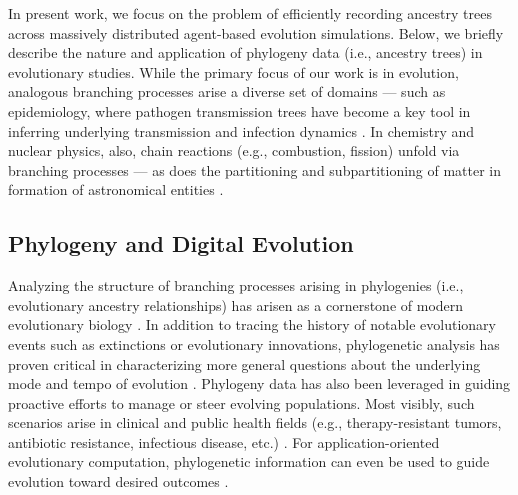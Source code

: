 In present work, we focus on the problem of efficiently recording ancestry trees across massively distributed agent-based evolution simulations.
Below, we briefly describe the nature and application of phylogeny data (i.e., ancestry trees) in evolutionary studies.
While the primary focus of our work is in evolution, analogous branching processes arise a diverse set of domains --- such as epidemiology, where pathogen transmission trees have become a key tool in inferring underlying transmission and infection dynamics \citep{giardina2017inference,voznica2022deep,wang2020role,colijn2014phylogenetic}.
In chemistry and nuclear physics, also, chain reactions (e.g., combustion, fission) unfold via branching processes \citep{UsonFornies1999,Pazsit2007} --- as does the partitioning and subpartitioning of matter in formation of astronomical entities \citep{Jofr2017}.

\subsection{Phylogeny and Digital Evolution}

Analyzing the structure of branching processes arising in phylogenies (i.e., evolutionary ancestry relationships) has arisen as a cornerstone of modern evolutionary biology \citep{faithConservationEvaluationPhylogenetic1992, STAMATAKIS2005phylogenetics,frenchHostPhylogenyShapes2023,kim2006discovery,lenski2003evolutionary}.
In addition to tracing the history of notable evolutionary events such as extinctions or evolutionary innovations, phylogenetic analysis has proven critical in characterizing more general questions about the underlying mode and tempo of evolution \citep{moreno2023toward,hernandez2022can,shahbandegan2022untangling,lewinsohnStatedependentEvolutionaryModels2023a,TODO}.
Phylogeny data has also been leveraged in guiding proactive efforts to manage or steer evolving populations.
Most visibly, such scenarios arise in clinical and public health fields (e.g., therapy-resistant tumors, antibiotic resistance, infectious disease, etc.) \citep{TODO}.
For application-oriented evolutionary computation, phylogenetic information can even be used to guide evolution toward desired outcomes \citep{lalejini2024phylogeny,lalejini2024runtime,murphy2008simple,burke2003increased}.

